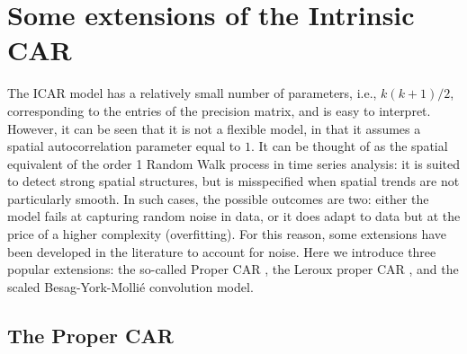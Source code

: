 \documentclass[openany, 11pt, oneside]{book}
\begin{document}
\section{Some extensions of the Intrinsic CAR} \label{section:CARs}

The ICAR model has a relatively small number of parameters, i.e., $k(k+1)/2$, corresponding to the entries of the precision matrix, and is easy to interpret. However, it can be seen that it is not a flexible model, in that it assumes a spatial autocorrelation parameter equal to $1$. It can be thought of as the spatial equivalent of the order 1 Random Walk process in time series analysis: it is suited to detect strong spatial structures, but is misspecified when spatial trends are not particularly smooth. In such cases, the possible outcomes are two: either the model fails at capturing random noise in data, or it does adapt to data but at the price of a higher complexity (overfitting). For this reason, some extensions have been developed in the literature to account for noise. Here we introduce three popular extensions: the so-called Proper CAR \parencite{PCAR_Gelfand}, the Leroux proper CAR \parencite{Leroux}, and the scaled Besag-York-Mollié \parencite[BYM2][]{BYM2} convolution model. 

\subsection{The Proper CAR} \label{subsection:pcar}
\end{document}
